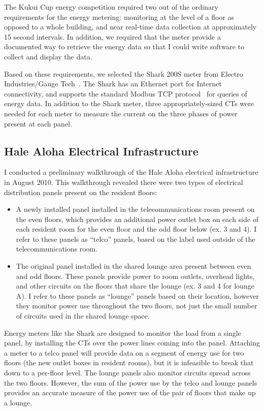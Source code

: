 The Kukui Cup energy competition required two out of the ordinary requirements for the energy metering: monitoring at the level of a floor as opposed to a whole building, and near real-time data collection at approximately 15 second intervals. In addition, we required that the meter provide a documented way to retrieve the energy data so that I could write software to collect and display the data.

Based on these requirements, we selected the Shark 200S meter from Electro Industries/Gauge Tech~\cite{shark-200s}. The Shark has an Ethernet port for Internet connectivity, and supports the standard Modbus TCP protocol~\cite{modbus-website} for queries of energy data. In addition to the Shark meter, three appropriately-sized CTs were needed for each meter to measure the current on the three phases of power present at each panel.


\subsection{Hale Aloha Electrical Infrastructure}
\label{sec:electrical-infrastructure}

I conducted a preliminary walkthrough of the Hale Aloha electrical infrastructure in August 2010. This walkthrough revealed there were two types of electrical distribution panels present on the resident floors:

\begin{itemize}
	\item A newly installed panel installed in the telecommunications room present on the even floors, which provides an additional power outlet box on each side of each resident room for the even floor and the odd floor below (ex. 3 and 4). I refer to these panels as ``telco'' panels, based on the label used outside of the telecommunications room.
  \item The original panel installed in the shared lounge area present between even and odd floors. These panels provide power to room outlets, overhead lights, and other circuits on the floors that share the lounge (ex. 3 and 4 for lounge A). I refer to these panels as ``lounge'' panels based on their location, however they monitor power use throughout the two floors, not just the small number of circuits used in the shared lounge space.
\end{itemize}

Energy meters like the Shark are designed to monitor the load from a single panel, by installing the CTs over the power lines coming into the panel. Attaching a meter to a telco panel will provide data on a segment of energy use for two floors (the new outlet boxes in resident rooms), but it is infeasible to break that down to a per-floor level. The lounge panels also monitor circuits spread across the two floors. However, the sum of the power use by the telco and lounge panels provides an accurate measure of the power use of the pair of floors that make up a lounge.


